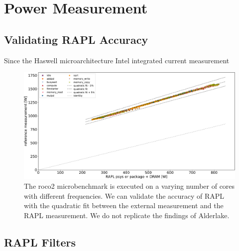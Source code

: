 \chapter{Power Measurement}

\section{Validating RAPL Accuracy}
Since the Haswell microarchitecture Intel integrated current measurement 


\begin{figure}[]
    \centering
    \includegraphics[width=\columnwidth]{fig/rapl-validation.pdf}
    \caption{\label{fig:validate-rapl}The roco2 microbenchmark is executed on a varying number of cores with different frequencies.
    We can validate the accuracy of RAPL with the quadratic fit between the external measurement and the RAPL measurement.
    We do not replicate the findings of Alderlake.}
\end{figure}

\section{RAPL Filters}
